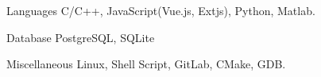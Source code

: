 

\begin{cvskills}

  \cvskill
    {Languages} %
    {C/C++, JavaScript(Vue.js, Extjs), Python, Matlab.} %

  \cvskill
    {Database} %
    {PostgreSQL, SQLite} %

  \cvskill
    {Miscellaneous} %
    {Linux, Shell Script, GitLab, CMake, GDB.} %

\end{cvskills}
